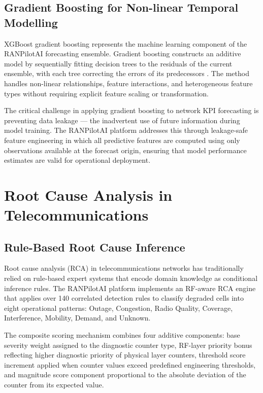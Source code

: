 \subsection{Gradient Boosting for Non-linear Temporal Modelling}

XGBoost gradient boosting represents the machine learning component of the RANPilotAI forecasting ensemble. Gradient boosting constructs an additive model by sequentially fitting decision trees to the residuals of the current ensemble, with each tree correcting the errors of its predecessors \cite{james2021}. The method handles non-linear relationships, feature interactions, and heterogeneous feature types without requiring explicit feature scaling or transformation.

The critical challenge in applying gradient boosting to network KPI forecasting is preventing data leakage — the inadvertent use of future information during model training. The RANPilotAI platform addresses this through leakage-safe feature engineering in which all predictive features are computed using only observations available at the forecast origin, ensuring that model performance estimates are valid for operational deployment.

\section{Root Cause Analysis in Telecommunications}

\subsection{Rule-Based Root Cause Inference}

Root cause analysis (RCA) in telecommunications networks has traditionally relied on rule-based expert systems that encode domain knowledge as conditional inference rules. The RANPilotAI platform implements an RF-aware RCA engine that applies over 140 correlated detection rules to classify degraded cells into eight operational patterns: Outage, Congestion, Radio Quality, Coverage, Interference, Mobility, Demand, and Unknown.

The composite scoring mechanism combines four additive components: base severity weight assigned to the diagnostic counter type, RF-layer priority bonus reflecting higher diagnostic priority of physical layer counters, threshold score increment applied when counter values exceed predefined engineering thresholds, and magnitude score component proportional to the absolute deviation of the counter from its expected value.

